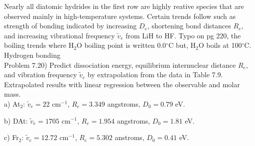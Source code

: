 \documentclass{article}
\begin{document}
  {\color{blue}
  Nearly all diatomic hydrides in the first row are highly reative species that are
  observed mainly in high-temperature systems. Certain trends follow such as strength
  of bonding indicated by increasing $D_e$, shortening bond distances $R_e$, and
  increasing vibrational frequency $\tilde{v}_e$ from LiH to HF. Typo on pg 220, the
  boiling trends where H$_2$O boiling point is written 0.0$^{\circ}$C but, H$_2$O boils
  at 100$^{\circ}$C. Hydrogen bonding}
  \\
  
  Problem 7.20) Predict dissociation energy, equilibrium internuclear distance $R_e$,
  and vibration frequency $\tilde{v}_e$ by extrapolation from the data in Table 7.9.
  \\

  \color{blue}
  Extrapolated results with linear regression between the observable and molar mass.
  \\
  
  a) At$_2$: $\tilde{v}_e=22$ cm$^{-1}$, $R_e=3.349$ angstroms, $D_0=0.79$ eV.

  b) DAt: $\tilde{v}_e=1705$ cm$^{-1}$, $R_e=1.954$ angstroms, $D_0=1.81$ eV.

  c) Fr$_2$: $\tilde{v}_e=12.72$ cm$^{-1}$, $R_e=5.302$ anstroms, $D_0=0.41$ eV.
\end{document}

